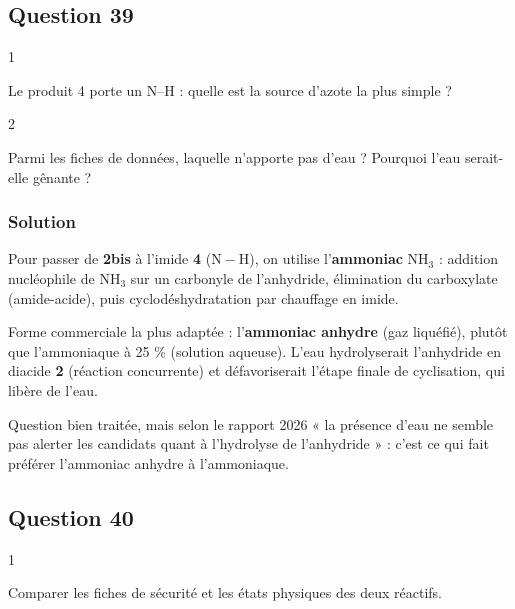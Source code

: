 \documentclass[11pt,a4paper]{article}
\begin{document}
\hypertarget{question-39}{%
\subsection{Question 39}\label{question-39}}

\begin{indication}{1}

Le produit 4 porte un N--H : quelle est la source d'azote la plus simple ?

\end{indication}

\begin{indication}{2}

Parmi les fiches de données, laquelle n'apporte pas d'eau ? Pourquoi l'eau serait-elle gênante ?

\end{indication}

\hypertarget{solution-38}{%
\subsubsection{Solution}\label{solution-38}}

Pour passer de \textbf{2bis} à l'imide \textbf{4} (\(\mathrm{N{-}H}\)), on utilise l'\textbf{ammoniac} \(\mathrm{NH_3}\) : addition nucléophile de \(\mathrm{NH_3}\) sur un carbonyle de l'anhydride, élimination du carboxylate (amide-acide), puis cyclodéshydratation par chauffage en imide.

Forme commerciale la plus adaptée : l'\textbf{ammoniac anhydre} (gaz liquéfié), plutôt que l'ammoniaque à 25 \% (solution aqueuse). L'eau hydrolyserait l'anhydride en diacide \textbf{2} (réaction concurrente) et défavoriserait l'étape finale de cyclisation, qui libère de l'eau.

\begin{jury}

Question bien traitée, mais selon le rapport 2026 « la présence d'eau ne semble pas alerter les candidats quant à l'hydrolyse de l'anhydride » : c'est ce qui fait préférer l'ammoniac anhydre à l'ammoniaque.

\end{jury}

\hypertarget{question-40}{%
\subsection{Question 40}\label{question-40}}

\begin{indication}{1}

Comparer les fiches de sécurité et les états physiques des deux réactifs.

\end{indication}
\end{document}
